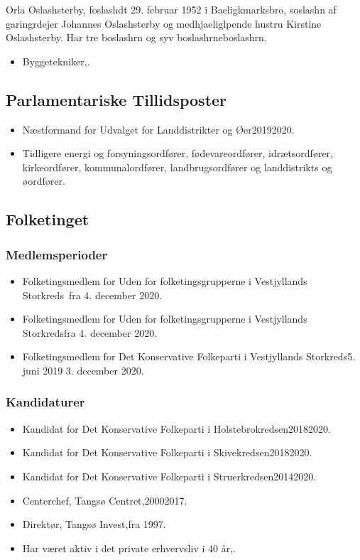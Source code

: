 \documentclass[11pt, a4paper]{awesome-cv}
\begin{document}
\makecvheader[R]
\makelettertitle
\begin{cvletter}
Orla Oslashsterby, foslashdt 29. februar 1952 i Baeligkmarksbro, soslashn af garingrdejer Johannes Oslashsterby og medhjaeliglpende hustru Kirstine Oslashsterby. Har tre boslashrn og syv boslashrneboslashrn.

\begin{itemize}
\item Byggetekniker,.
\end{itemize}
\subsection*{Parlamentariske Tillidsposter}
\begin{itemize}
\item Næstformand for Udvalget for Landdistrikter og Øer20192020.
\item Tidligere energi og forsyningsordfører, fødevareordfører, idrætsordfører, kirkeordfører, kommunalordfører, landbrugsordfører og landdistrikts og øordfører.
\end{itemize}
\subsection*{Folketinget}
\subsubsection*{Medlemsperioder}
\begin{itemize}
\item Folketingsmedlem for Uden for folketingsgrupperne i Vestjyllands Storkreds fra 4. december 2020.
\item Folketingsmedlem for Uden for folketingsgrupperne i Vestjyllands Storkredsfra 4. december 2020.
\item Folketingsmedlem for Det Konservative Folkeparti i Vestjyllands Storkreds5. juni 2019  3. december 2020.
\end{itemize}
\subsubsection*{Kandidaturer}
\begin{itemize}
\item Kandidat for Det Konservative Folkeparti i Holstebrokredsen20182020.
\item Kandidat for Det Konservative Folkeparti i Skivekredsen20182020.
\item Kandidat for Det Konservative Folkeparti i Struerkredsen20142020.
\end{itemize}
\begin{itemize}
\item Centerchef, Tangsø Centret,20002017.
\item Direktør, Tangsø Invest,fra 1997.
\item Har været aktiv i det private erhvervsliv i 40 år,.
\end{itemize}
\end{cvletter}
\end{document}
